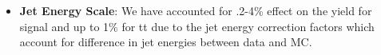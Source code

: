 \begin{itemize}


\item \textbf{Jet Energy Scale}: We have accounted for .2-4\% effect on the yield for signal and up to 1\% for tt due to the jet energy correction factors which account for difference in jet energies between data and MC. %



\end{itemize}
